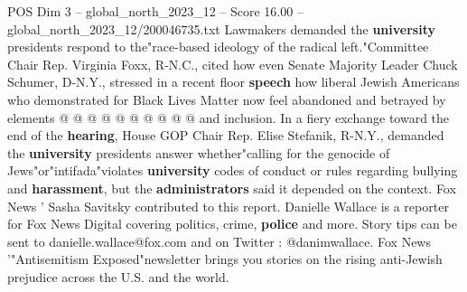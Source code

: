 \begin{textsample}{POS Dim 3 – global\_north\_2023\_12 – Score 16.00 – global\_north\_2023\_12/200046735.txt}
Lawmakers demanded the \textbf{university} presidents respond to the"race-based ideology of the radical left."Committee Chair Rep.
Virginia Foxx, R-N.C., cited how even Senate Majority Leader Chuck Schumer, D-N.Y., stressed in a recent floor \textbf{speech} how liberal Jewish Americans who demonstrated for Black Lives Matter now feel abandoned and betrayed by elements @ @ @ @ @ @ @ @ @ @ and inclusion.
In a fiery exchange toward the end of the \textbf{hearing}, House GOP Chair Rep.
Elise Stefanik, R-N.Y., demanded the \textbf{university} presidents answer whether"calling for the genocide of Jews"or"intifada"violates \textbf{university} codes of conduct or rules regarding bullying and \textbf{harassment}, but the \textbf{administrators} said it depended on the context.
Fox News ' Sasha Savitsky contributed to this report.
Danielle Wallace is a reporter for Fox News Digital covering politics, crime, \textbf{police} and more.
Story tips can be sent to danielle.wallace@fox.com and on Twitter : @danimwallace.
Fox News '"Antisemitism Exposed"newsletter brings you stories on the rising anti-Jewish prejudice across the U.S. and the world.

\end{textsample}
